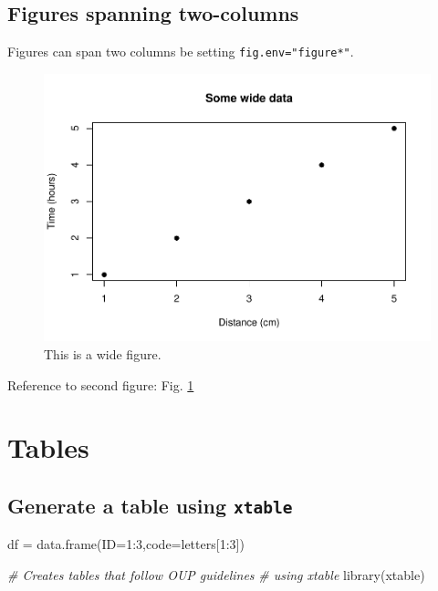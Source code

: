 \documentclass[webpdf,large,contemporary,namedate]{oup-authoring-template}
\newenvironment{Shaded}{\begin{snugshade}}{\end{snugshade}}
\newcommand{\AttributeTok}[1]{\textcolor[rgb]{0.77,0.63,0.00}{#1}}
\newcommand{\CommentTok}[1]{\textcolor[rgb]{0.56,0.35,0.01}{\textit{#1}}}
\newcommand{\DecValTok}[1]{\textcolor[rgb]{0.00,0.00,0.81}{#1}}
\newcommand{\FunctionTok}[1]{\textcolor[rgb]{0.00,0.00,0.00}{#1}}
\newcommand{\NormalTok}[1]{#1}
\newcommand{\OtherTok}[1]{\textcolor[rgb]{0.56,0.35,0.01}{#1}}
\newcommand{\SpecialCharTok}[1]{\textcolor[rgb]{0.00,0.00,0.00}{#1}}
\theoremstyle{thmstyleone}
\theoremstyle{thmstyletwo}
\theoremstyle{thmstylethree}
\begin{document}
\hypertarget{figures-spanning-two-columns}{%
\subsection{Figures spanning
two-columns}\label{figures-spanning-two-columns}}

Figures can span two columns be setting \texttt{fig.env="figure*"}.

\begin{figure}[th]
\includegraphics[width=1\linewidth]{x_files/figure-latex/fig2-1} \caption{This is a wide figure.}\label{fig:fig2}
\end{figure}

Reference to second figure: Fig. \ref{fig:fig2}

\hypertarget{tables}{%
\section{Tables}\label{tables}}

\hypertarget{generate-a-table-using-xtable}{%
\subsection{\texorpdfstring{Generate a table using
\texttt{xtable}}{Generate a table using xtable}}\label{generate-a-table-using-xtable}}

\begin{Shaded}
\begin{Highlighting}[]
\NormalTok{df }\OtherTok{=} \FunctionTok{data.frame}\NormalTok{(}\AttributeTok{ID=}\DecValTok{1}\SpecialCharTok{:}\DecValTok{3}\NormalTok{,}\AttributeTok{code=}\NormalTok{letters[}\DecValTok{1}\SpecialCharTok{:}\DecValTok{3}\NormalTok{])}

\CommentTok{\# Creates tables that follow OUP guidelines }
\CommentTok{\# using xtable}
\FunctionTok{library}\NormalTok{(xtable) }
\end{Highlighting}
\end{Shaded}
\end{document}
